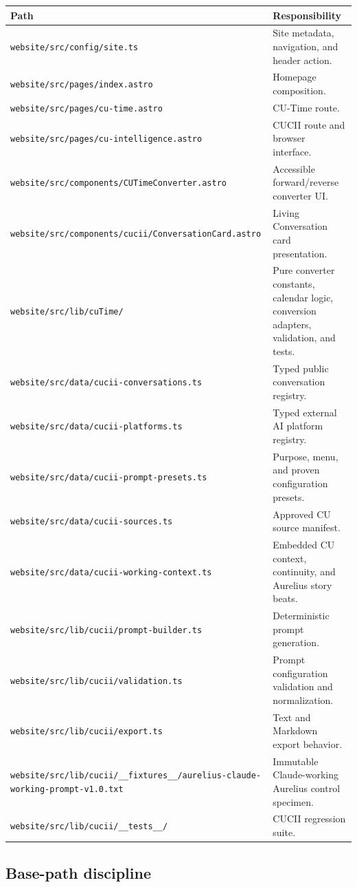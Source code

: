 \documentclass[11pt,letterpaper]{article}
\newcommand{\filepath}[1]{\nolinkurl{#1}}
\begin{document}
\begin{longtable}{L{2.55in}L{3.85in}}
\toprule
\textbf{Path} & \textbf{Responsibility} \\
\midrule
\filepath{website/src/config/site.ts} & Site metadata, navigation, and header action. \\
\filepath{website/src/pages/index.astro} & Homepage composition. \\
\filepath{website/src/pages/cu-time.astro} & CU-Time route. \\
\filepath{website/src/pages/cu-intelligence.astro} & CUCII route and browser interface. \\
\filepath{website/src/components/CUTimeConverter.astro} & Accessible forward/reverse converter UI. \\
\filepath{website/src/components/cucii/ConversationCard.astro} & Living Conversation card presentation. \\
\filepath{website/src/lib/cuTime/} & Pure converter constants, calendar logic, conversion adapters, validation, and tests. \\
\filepath{website/src/data/cucii-conversations.ts} & Typed public conversation registry. \\
\filepath{website/src/data/cucii-platforms.ts} & Typed external AI platform registry. \\
\filepath{website/src/data/cucii-prompt-presets.ts} & Purpose, menu, and proven configuration presets. \\
\filepath{website/src/data/cucii-sources.ts} & Approved CU source manifest. \\
\filepath{website/src/data/cucii-working-context.ts} & Embedded CU context, continuity, and Aurelius story beats. \\
\filepath{website/src/lib/cucii/prompt-builder.ts} & Deterministic prompt generation. \\
\filepath{website/src/lib/cucii/validation.ts} & Prompt configuration validation and normalization. \\
\filepath{website/src/lib/cucii/export.ts} & Text and Markdown export behavior. \\
\filepath{website/src/lib/cucii/__fixtures__/aurelius-claude-working-prompt-v1.0.txt} & Immutable Claude-working Aurelius control specimen. \\
\filepath{website/src/lib/cucii/__tests__/} & CUCII regression suite. \\
\bottomrule
\end{longtable}

\subsection{Base-path discipline}
\end{document}
